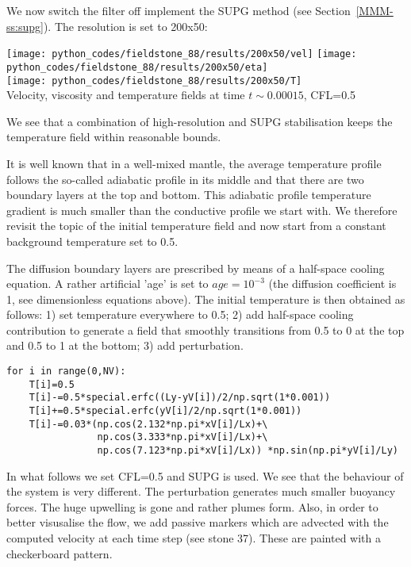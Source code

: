 We now switch the filter off implement the SUPG method (see Section~\ref{MMM-ss:supg}). 
The resolution is set to 200x50:
\begin{center}
\texttt{[image: python\_codes/fieldstone\_88/results/200x50/vel]}
\texttt{[image: python\_codes/fieldstone\_88/results/200x50/eta]}\\
\texttt{[image: python\_codes/fieldstone\_88/results/200x50/T]}\\
{\captionfont Velocity, viscosity and temperature fields at time $t\sim 0.00015$, CFL=0.5} 
\end{center}
We see that a combination of high-resolution and SUPG stabilisation keeps the 
temperature field within reasonable bounds. 


It is well known that in a well-mixed mantle, the average temperature profile 
follows the so-called adiabatic profile in its middle and that there are two 
boundary layers at the top and bottom. This adiabatic profile temperature gradient 
is much smaller than the conductive profile we start with.
We therefore revisit the topic of the initial temperature field and now start 
from a constant background temperature set to 0.5. 

The diffusion boundary layers are prescribed by means of a half-space cooling equation.
A rather artificial 'age' is set to $age=10^{-3}$ (the diffusion coefficient is 1, 
see dimensionless equations above).
The initial temperature is then obtained as follows: 1) set temperature everywhere to 0.5; 
2) add half-space cooling contribution to generate a field that smoothly transitions 
from 0.5 to 0 at the top and 0.5 to 1 at the bottom; 3) add perturbation. 

\begin{lstlisting}
for i in range(0,NV):
    T[i]=0.5
    T[i]-=0.5*special.erfc((Ly-yV[i])/2/np.sqrt(1*0.001))
    T[i]+=0.5*special.erfc(yV[i]/2/np.sqrt(1*0.001))
    T[i]-=0.03*(np.cos(2.132*np.pi*xV[i]/Lx)+\
                np.cos(3.333*np.pi*xV[i]/Lx)+\
                np.cos(7.123*np.pi*xV[i]/Lx)) *np.sin(np.pi*yV[i]/Ly)
\end{lstlisting}

In what follows we set CFL=0.5 and SUPG is used.
We see that the behaviour of the system is very different. The perturbation generates 
much smaller buoyancy forces. The huge upwelling is gone and rather plumes form. 
Also, in order to better visusalise the flow, we add passive markers which are 
advected with the computed velocity at each time step (see stone 37).
These are painted with a checkerboard pattern.

